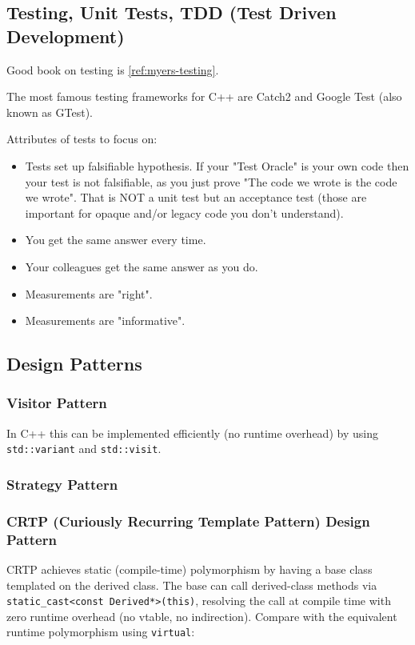 \documentclass{article}
\begin{document}
\subsection{Testing, Unit Tests, TDD (Test Driven Development)}
Good book on testing is \ref{ref:myers-testing}.

The most famous testing frameworks for C++ are Catch2 and Google Test (also known as GTest).

Attributes of tests to focus on:
\begin{itemize}
    \item[Falsifiable] Tests set up falsifiable hypothesis. If your "Test Oracle" is your own code then your test is not falsifiable, as you just prove "The code we wrote is the code we wrote". That is NOT a unit test but an acceptance test (those are important for opaque and/or legacy code you don't understand).
    \item[Repeatable] You get the same answer every time.
    \item[Replicable] Your colleagues get the same answer as you do.
    \item[Accuracy] Measurements are "right".
    \item[Precision] Measurements are "informative".
\end{itemize}

\subsection{Design Patterns}
\subsubsection{Visitor Pattern}
In C++ this can be implemented efficiently (no runtime overhead) by using \texttt{std::variant} and \texttt{std::visit}.

\subsubsection{Strategy Pattern}

\subsubsection{CRTP (Curiously Recurring Template Pattern) Design Pattern}
CRTP achieves static (compile-time) polymorphism by having a base class templated on the derived class. The base can call derived-class methods via \texttt{static\_cast<const Derived*>(this)}, resolving the call at compile time with zero runtime overhead (no vtable, no indirection). Compare with the equivalent runtime polymorphism using \texttt{virtual}:
\end{document}
